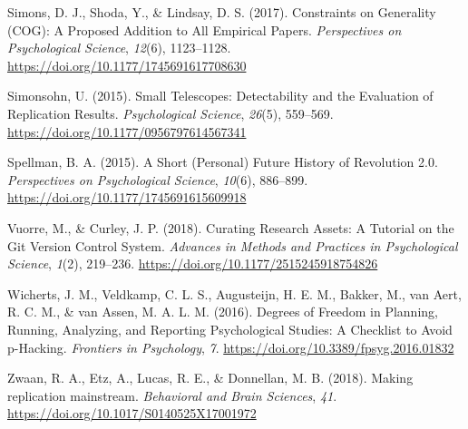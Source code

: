 \documentclass[11pt,man]{article}
\begin{document}
\hypertarget{ref-simons_constraints_2017}{}
Simons, D. J., Shoda, Y., \& Lindsay, D. S. (2017). Constraints on
Generality (COG): A Proposed Addition to All Empirical Papers.
\emph{Perspectives on Psychological Science}, \emph{12}(6), 1123--1128.
\url{https://doi.org/10.1177/1745691617708630}

\hypertarget{ref-simonsohn_small_2015}{}
Simonsohn, U. (2015). Small Telescopes: Detectability and the Evaluation
of Replication Results. \emph{Psychological Science}, \emph{26}(5),
559--569. \url{https://doi.org/10.1177/0956797614567341}

\hypertarget{ref-spellman_short_2015}{}
Spellman, B. A. (2015). A Short (Personal) Future History of Revolution
2.0. \emph{Perspectives on Psychological Science}, \emph{10}(6),
886--899. \url{https://doi.org/10.1177/1745691615609918}

\hypertarget{ref-vuorre_curating_2018}{}
Vuorre, M., \& Curley, J. P. (2018). Curating Research Assets: A
Tutorial on the Git Version Control System. \emph{Advances in Methods
and Practices in Psychological Science}, \emph{1}(2), 219--236.
\url{https://doi.org/10.1177/2515245918754826}

\hypertarget{ref-wicherts_degrees_2016}{}
Wicherts, J. M., Veldkamp, C. L. S., Augusteijn, H. E. M., Bakker, M.,
van Aert, R. C. M., \& van Assen, M. A. L. M. (2016). Degrees of Freedom
in Planning, Running, Analyzing, and Reporting Psychological Studies: A
Checklist to Avoid p-Hacking. \emph{Frontiers in Psychology}, \emph{7}.
\url{https://doi.org/10.3389/fpsyg.2016.01832}

\hypertarget{ref-zwaan_making_2018}{}
Zwaan, R. A., Etz, A., Lucas, R. E., \& Donnellan, M. B. (2018). Making
replication mainstream. \emph{Behavioral and Brain Sciences}, \emph{41}.
\url{https://doi.org/10.1017/S0140525X17001972}
\end{document}
